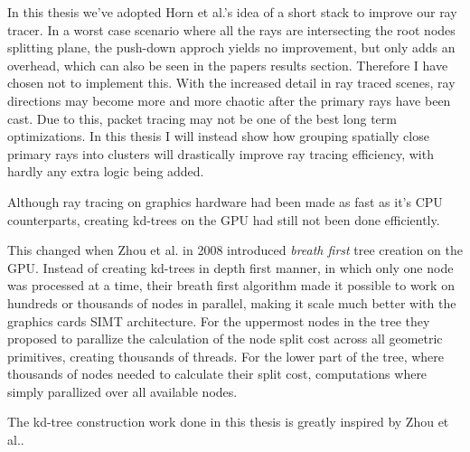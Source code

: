 In this thesis we've adopted Horn et al.'s idea of a short stack to
improve our ray tracer. In a worst case scenario where all the rays
are intersecting the root nodes splitting plane, the push-down approch
yields no improvement, but only adds an overhead, which can also be
seen in the papers results section. Therefore I have chosen not to
implement this. With the increased detail in ray traced scenes, ray
directions may become more and more chaotic after the primary rays
have been cast. Due to this, packet tracing may not be one of the best
long term optimizations. In this thesis I will instead show how
grouping spatially close primary rays into clusters will drastically
improve ray tracing efficiency, with hardly any extra logic being
added.



Although ray tracing on graphics hardware had been made as fast as
it's CPU counterparts, creating kd-trees on the GPU had still not been
done efficiently. 


This changed when Zhou et al. in 2008 introduced
\textit{breath first} tree creation on the GPU. Instead of creating
kd-trees in depth first manner, in which only one node was processed
at a time, their breath first algorithm made it possible to work on
hundreds or thousands of nodes in parallel, making it scale much
better with the graphics cards SIMT architecture. For the uppermost
nodes in the tree they proposed to parallize the calculation of the
node split cost across all geometric primitives, creating thousands of
threads. For the lower part of the tree, where thousands of nodes
needed to calculate their split cost, computations where simply
parallized over all available nodes.




The kd-tree construction work done in this thesis is greatly inspired
by Zhou et al..

